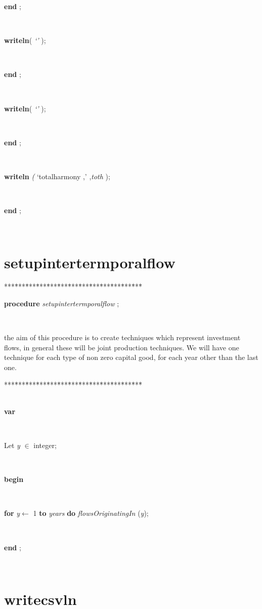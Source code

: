 \documentclass[10pt, a4paper]{article}
\begin{document}
\begin{tabbing}
\<\-\parbox{14cm}{\textsf{\textbf{end} ;}}\\
\parbox{14cm}{\textsf{\textbf{writeln}(\textit{\textrm{\textup { `' } }})}; }\\
\<\-\parbox{14cm}{\textsf{\textbf{end} ;}}\\
\parbox{14cm}{\textsf{\textbf{writeln}(\textit{\textrm{\textup { `' } }})}; }\\
\<\-\parbox{14cm}{\textsf{\textbf{end} ;}}\\
\parbox{14cm}{\textsf{\textbf{writeln} \textit{(} \textrm{\textup { `totalharmony ,' } },\textit{toth} );}}\\
\<\-\parbox{14cm}{\textsf{\textbf{end} ;}}\\
\end{tabbing}
\section{setupintertermporalflow}\label{sec:harmonyplansetupintertermporalflow}

\begin{tabbing}
***\=***\=***\=***\=***\=***\=***\=***\=***\=***\=***\=***\=***\=\kill
\parbox{14cm}{\textsf{\textbf{procedure}  \textit{setupintertermporalflow} ;}}\\
\end{tabbing}
the aim of this procedure is to create techniques which represent
investment flows, in general these will be joint production techniques.
We will have one technique for each type of non zero capital good, for each year
other than the last one.
\begin{tabbing}
***\=***\=***\=***\=***\=***\=***\=***\=***\=***\=***\=***\=***\=\kill
\\
\\
\+\parbox{14cm}{\textsf{\textbf{var} }}\\
\parbox{14cm}{\textsf{Let \textit{y} $\in$ integer;}}\\
\-\<\+\parbox{14cm}{\textsf{\textbf{begin} }}\\
\parbox{14cm}{\textsf {\textbf {for } \textsf{\textit{y}$\leftarrow$ 1} \textbf{ to } \textsf{\textit{years}} \textbf{ do } \textsf{\textit{flowsOriginatingIn} (\textit{y})}; }}\\
\<\-\parbox{14cm}{\textsf{\textbf{end} ;}}\\
\end{tabbing}
\section{writecsvln}\label{sec:harmonyplan/printResultswritecsvln}
\end{document}
